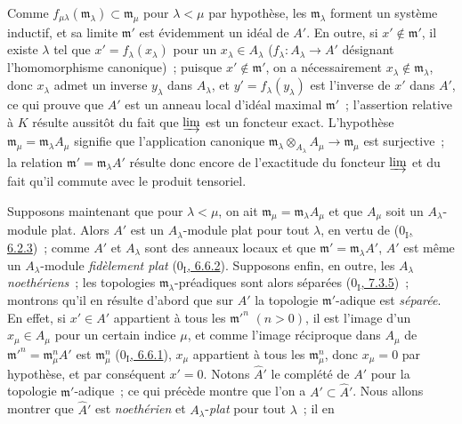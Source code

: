 Comme $f_{\mu\lambda}(\mathfrak m_\lambda)\subset\mathfrak m_\mu$ pour
$\lambda<\mu$ par hypothèse, les $\mathfrak m_\lambda$ forment un système
inductif, et sa limite $\mathfrak m'$ est évidemment un idéal de $A'$. En
outre, si $x'\notin\mathfrak m'$, il existe $\lambda$ tel que
$x'=f_\lambda(x_\lambda)$ pour un $x_\lambda\in A_\lambda$
($f_\lambda:A_\lambda\to A'$ désignant l'homomorphisme canonique)~; puisque
$x'\notin\mathfrak m'$, on a nécessairement
$x_\lambda\notin\mathfrak m_\lambda$, donc $x_\lambda$ admet un inverse
$y_\lambda$ dans $A_\lambda$, et $y'=f_\lambda(y_\lambda)$ est l'inverse de
$x'$ dans $A'$, ce qui prouve que $A'$ est un anneau local d'idéal maximal
$\mathfrak m'$~; l'assertion relative à $K$ résulte aussitôt du fait que
$\varinjlim$ est un foncteur exact. L'hypothèse
$\mathfrak m_\mu=\mathfrak m_\lambda A_\mu$ signifie que l'application
canonique
$\mathfrak m_\lambda\otimes_{A_\lambda}A_\mu\to\mathfrak m_\mu$ est
surjective~; la relation $\mathfrak m'=\mathfrak m_\lambda A'$ résulte donc
encore de l'exactitude du foncteur $\varinjlim$ et du fait qu'il commute avec
le produit tensoriel.

Supposons maintenant que pour $\lambda<\mu$, on ait
$\mathfrak m_\mu=\mathfrak m_\lambda A_\mu$ et que $A_\mu$ soit un
$A_\lambda$-module plat. Alors $A'$ est un $A_\lambda$-module plat pour tout
$\lambda$, en vertu de (\hyperref[0.6.2.3-fr]{$0_{\mathrm I}$, 6.2.3})~;
comme $A'$ et $A_\lambda$ sont des anneaux locaux et que
$\mathfrak m'=\mathfrak m_\lambda A'$, $A'$ est même un
$A_\lambda$-module \emph{fidèlement plat}
(\hyperref[0.6.6.2-fr]{$0_{\mathrm I}$, 6.6.2}). Supposons enfin, en outre,
les $A_\lambda$ \emph{noethériens}~; les topologies
$\mathfrak m_\lambda$-préadiques sont alors séparées
(\hyperref[0.7.3.5-fr]{$0_{\mathrm I}$, 7.3.5})~; montrons qu'il en résulte
d'abord que sur $A'$ la topologie $\mathfrak m'$-adique est \emph{séparée}.
En effet, si $x'\in A'$ appartient à tous les $\mathfrak m'^{n}$ $(n>0)$,
il est l'image d'un $x_\mu\in A_\mu$ pour un certain indice $\mu$, et comme
l'image réciproque dans $A_\mu$ de
$\mathfrak m'^{n}=\mathfrak m_\mu^n A'$ est $\mathfrak m_\mu^n$
(\hyperref[0.6.6.1-fr]{$0_{\mathrm I}$, 6.6.1}), $x_\mu$ appartient à tous
les $\mathfrak m_\mu^n$, donc $x_\mu=0$ par hypothèse, et par conséquent
$x'=0$. Notons $\widehat A'$ le complété de $A'$ pour la topologie
$\mathfrak m'$-adique~; ce qui précède montre que l'on a
$A'\subset\widehat A'$. Nous allons montrer que $\widehat A'$ est
\emph{noethérien} et $A_\lambda$-\emph{plat} pour tout $\lambda$~; il en
